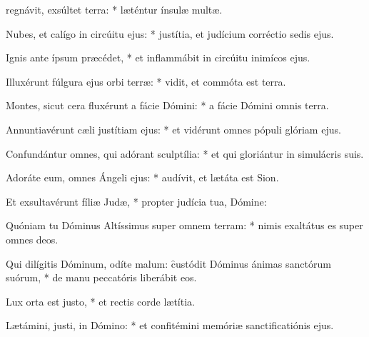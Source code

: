 \begin{psalmus}
    
     regnávit, exsúltet terra: * læténtur ínsulæ multæ.
    
    Nubes, et calígo in circúitu ejus: * justítia, et judícium corréctio sedis ejus.
    
    Ignis ante ípsum præcédet, * et inflammábit in circúitu inimícos ejus.
    
    Illuxérunt fúlgura ejus orbi terræ: * vidit, et commóta est terra.
    
    Montes, sicut cera fluxérunt a fácie Dómini: * a fácie Dómini omnis terra.
    
    Annuntiavérunt cæli justítiam ejus: * et vidérunt omnes pópuli glóriam ejus.
    
    Confundántur omnes, qui adórant sculptília: * et qui gloriántur in simulácris suis.
    
    Adoráte eum, omnes Ángeli ejus: * audívit, et lætáta est Sion.
    
    Et exsultavérunt fíliæ Judæ, * propter judícia tua, Dómine:
    
    Quóniam tu Dóminus Altíssimus super omnem terram: * nimis exaltátus es super omnes deos.
    
    Qui dilígitis Dóminum, odíte malum: \f custódit Dóminus ánimas sanctórum suórum, * de manu peccatóris liberábit eos.
    
    Lux orta est justo, * et rectis corde lætítia.
    
    Lætámini, justi, in Dómino: * et confitémini memóriæ sanctificatiónis ejus.
    
    \end{psalmus}
